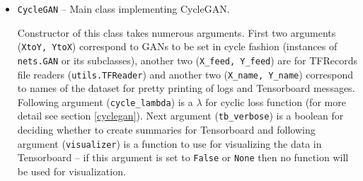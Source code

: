 \begin{itemize}
\item \texttt{CycleGAN} -- Main class implementing CycleGAN.
\begin{description}
 Constructor of this class takes numerous arguments. First two arguments (\texttt{XtoY, YtoX}) correspond to GANs to be set in cycle fashion (instances of \texttt{nets.GAN} or its subclasses), another two (\texttt{X\_feed, Y\_feed}) are for TFRecords file readers (\texttt{utils.TFReader}) and another two (\texttt{X\_name, Y\_name}) correspond to names of the dataset for pretty printing of logs and Tensorboard messages. Following argument (\texttt{cycle\_lambda}) is a $\lambda$ for cyclic loss function (for more detail see section \ref{cyclegan}). Next argument (\texttt{tb\_verbose}) is a boolean for deciding whether to create summaries for Tensorboard and following argument (\texttt {visualizer}) is a function to use for visualizing the data in Tensorboard -- if this argument is set to \texttt{False} or \texttt{None} then no function will be used for visualization.


\end{description}
\end{itemize}
